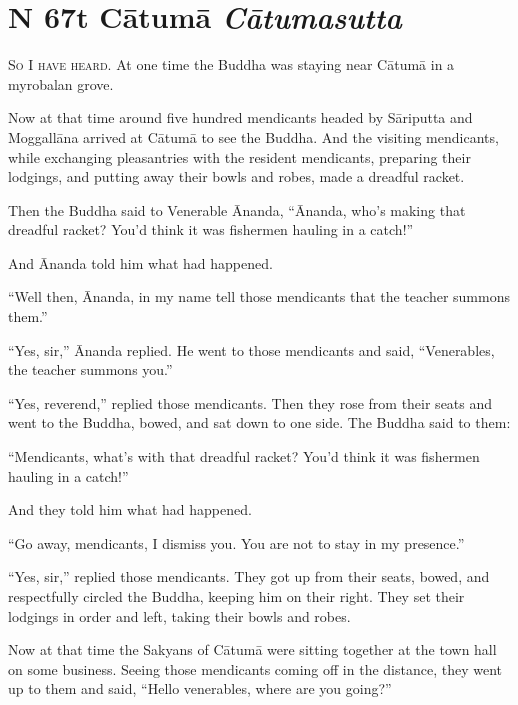 \documentclass[12pt,openany]{book}%
\newcommand*{\suttatitleacronym}[1]{\smaller[2]{#1}\vspace*{.3em}}
\newcommand*{\suttatitletranslation}[1]{\linebreak{#1}}
\newcommand*{\suttatitleroot}[1]{\linebreak\smaller[2]\itshape{#1}}
\newcommand*{\tocacronym}[1]{\hspace*{-3.3em}{#1}\quad}
\newcommand*{\toctranslation}[1]{#1}
\newcommand*{\tocroot}[1]{(\textit{#1})}
\newcommand*{\scevam}[1]{\textsc{#1}}
\begin{document}
%
\section*{{\suttatitleacronym MN 67}{\suttatitletranslation At Cātumā }{\suttatitleroot Cātumasutta}}
\addcontentsline{toc}{section}{\tocacronym{MN 67} \toctranslation{At Cātumā } \tocroot{Cātumasutta}}

\scevam{So I have heard. }At one time the Buddha was staying near \textsanskrit{Cātumā} in a myrobalan grove. 

Now at that time around five hundred mendicants headed by \textsanskrit{Sāriputta} and \textsanskrit{Moggallāna} arrived at \textsanskrit{Cātumā} to see the Buddha. And the visiting mendicants, while exchanging pleasantries with the resident mendicants, preparing their lodgings, and putting away their bowls and robes, made a dreadful racket. 

Then the Buddha said to Venerable Ānanda, “Ānanda, who’s making that dreadful racket? You’d think it was fishermen hauling in a catch!” 

And Ānanda told him what had happened. 

“Well then, Ānanda, in my name tell those mendicants that the teacher summons them.” 

“Yes, sir,” Ānanda replied. He went to those mendicants and said, “Venerables, the teacher summons you.” 

“Yes, reverend,” replied those mendicants. Then they rose from their seats and went to the Buddha, bowed, and sat down to one side. The Buddha said to them: 

“Mendicants, what’s with that dreadful racket? You’d think it was fishermen hauling in a catch!” 

And they told him what had happened. 

“Go away, mendicants, I dismiss you. You are not to stay in my presence.” 

“Yes, sir,” replied those mendicants. They got up from their seats, bowed, and respectfully circled the Buddha, keeping him on their right. They set their lodgings in order and left, taking their bowls and robes. 

Now at that time the Sakyans of \textsanskrit{Cātumā} were sitting together at the town hall on some business. Seeing those mendicants coming off in the distance, they went up to them and said, “Hello venerables, where are you going?” 
\end{document}
